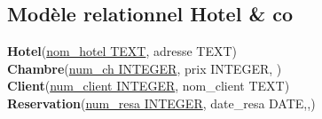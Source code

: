 \documentclass[a4paper,12pt,french]{book}
\begin{document}
\subsection*{Modèle relationnel \og Hotel \& co\fg}

\textbf{Hotel}(\uline{nom\_hotel TEXT}, adresse TEXT)\\

\textbf{Chambre}(\uline{num\_ch INTEGER}, prix INTEGER, )\\

\textbf{Client}(\uline{num\_client INTEGER}, nom\_client TEXT)\\


\textbf{Reservation}(\uline{num\_resa INTEGER}, date\_resa DATE,,)
\end{document}

